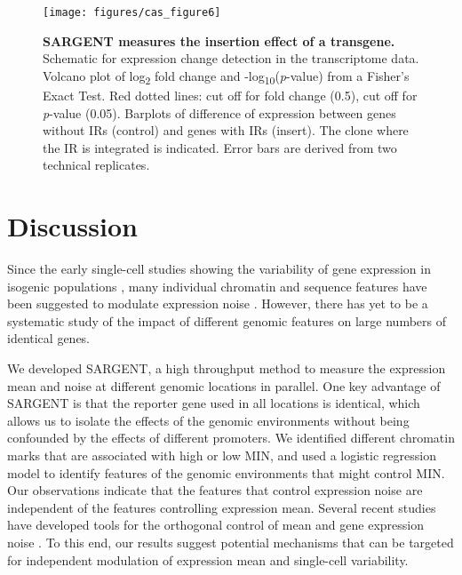 \begin{figure}[tbp]  
    \centering
    \texttt{[image: figures/cas\_figure6]}
    \caption[SARGENT measures the insertion effect of a transgene.]{%
        \textbf{SARGENT measures the insertion effect of a transgene.}
        Schematic for expression change detection in the transcriptome data.
        Volcano plot of log\textsubscript{2} fold change and -log\textsubscript{10}(\textit{p}-value) from a Fisher’s Exact Test. Red dotted lines: cut off for fold change (0.5), cut off for \textit{p}-value (0.05).
        Barplots of difference of expression between genes without IRs (control) and genes with IRs (insert). The clone where the IR is integrated is indicated. Error bars are derived from two technical replicates.
    }
    \label{fig:cas_figure6}
\end{figure}

\section{Discussion}

Since the early single-cell studies showing the variability of gene expression in isogenic populations \cite{elowitzmb_swainps:StochasticGene2002}, many individual chromatin and sequence features have been suggested to modulate expression noise \cite{raja_vanoudenaardena:NatureNurture2008, raja_tyagis:StochasticMRNA2006,bonnyar_el-samadh:OrthogonalControl2021, desairv_weinbergerls:DNARepair2021}. However, there has yet to be a systematic study of the impact of different genomic features on large numbers of identical genes. 
   
We developed SARGENT, a high throughput method to measure the expression mean and noise at different genomic locations in parallel. One key advantage of SARGENT is that the reporter gene used in all locations is identical, which allows us to isolate the effects of the genomic environments without being confounded by the effects of different promoters. We identified different chromatin marks that are associated with high or low MIN, and used a logistic regression model to identify features of the genomic environments that might control MIN. Our observations indicate that the features that control expression noise are independent of the features controlling expression mean. Several recent studies have developed tools for the orthogonal control of mean and gene expression noise \cite{bonnyar_el-samadh:OrthogonalControl2021,benzingerd_khammashm:PulsatileInputs2018, michaelsys_fulgata:PreciseTuning2019}. To this end, our results suggest potential mechanisms that can be targeted for independent modulation of expression mean and single-cell variability. 

